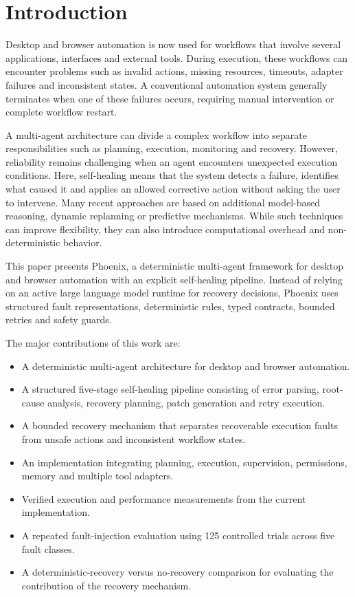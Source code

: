 \documentclass[conference]{IEEEtran}
\begin{document}
\section{Introduction}
Desktop and browser automation is now used for workflows that involve several applications, interfaces and external tools. During execution, these workflows can encounter problems such as invalid actions, missing resources, timeouts, adapter failures and inconsistent states. A conventional automation system generally terminates when one of these failures occurs, requiring manual intervention or complete workflow restart.

A multi-agent architecture can divide a complex workflow into separate responsibilities such as planning, execution, monitoring and recovery. However, reliability remains challenging when an agent encounters unexpected execution conditions. Here, self-healing means that the system detects a failure, identifies what caused it and applies an allowed corrective action without asking the user to intervene. Many recent approaches are based on additional model-based reasoning, dynamic replanning or predictive mechanisms. While such techniques can improve flexibility, they can also introduce computational overhead and non-deterministic behavior.

This paper presents Phoenix, a deterministic multi-agent framework for desktop and browser automation with an explicit self-healing pipeline. Instead of relying on an active large language model runtime for recovery decisions, Phoenix uses structured fault representations, deterministic rules, typed contracts, bounded retries and safety guards.

The major contributions of this work are:
\begin{itemize}
    \item A deterministic multi-agent architecture for desktop and browser automation.
    \item A structured five-stage self-healing pipeline consisting of error parsing, root-cause analysis, recovery planning, patch generation and retry execution.
    \item A bounded recovery mechanism that separates recoverable execution faults from unsafe actions and inconsistent workflow states.
    \item An implementation integrating planning, execution, supervision, permissions, memory and multiple tool adapters.
    \item Verified execution and performance measurements from the current implementation.
    \item A repeated fault-injection evaluation using 125 controlled trials across five fault classes.
    \item A deterministic-recovery versus no-recovery comparison for evaluating the contribution of the recovery mechanism.
\end{itemize}
\end{document}
